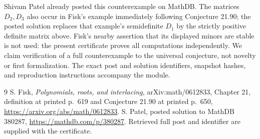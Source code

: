 \documentclass[11pt]{article}
\begin{document}
Shivam Patel already posted this counterexample on MathDB. The matrices $D_2,D_3$ also occur in Fisk's example immediately following Conjecture 21.90; the posted solution replaces that example's semidefinite $D_1$ by the strictly positive definite matrix above. Fisk's nearby assertion that its displayed minors are stable is not used: the present certificate proves all computations independently. We claim verification of a full counterexample to the universal conjecture, not novelty or first formalization. The exact post and solution identifiers, snapshot hashes, and reproduction instructions accompany the module.
\begin{thebibliography}{9}
 S. Fisk, \emph{Polynomials, roots, and interlacing}, arXiv:math/0612833, Chapter 21, definition at printed p.~619 and Conjecture 21.90 at printed p.~650, \url{https://arxiv.org/abs/math/0612833}.
 S. Patel, posted solution to MathDB 380287, \url{https://mathdb.com/p/380287}. Retrieved full post and identifier are supplied with the certificate.
\end{thebibliography}
\end{document}

